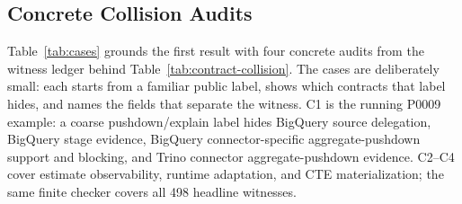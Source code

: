 \subsection{Concrete Collision Audits}
\label{sec:cases}

Table~\ref{tab:cases} grounds the first result with four concrete audits from the witness ledger behind Table~\ref{tab:contract-collision}.  The cases are deliberately small: each starts from a familiar public label, shows which contracts that label hides, and names the fields that separate the witness.  C1 is the running P0009 example: a coarse pushdown/explain label hides BigQuery source delegation, BigQuery stage evidence, BigQuery connector-specific aggregate-pushdown support and blocking, and Trino connector aggregate-pushdown evidence.  C2--C4 cover estimate observability, runtime adaptation, and CTE materialization; the same finite checker covers all 498 headline witnesses.


